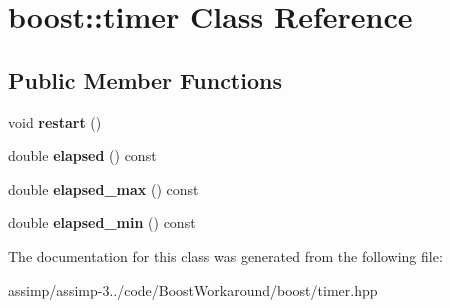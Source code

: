 \hypertarget{classboost_1_1timer}{\section{boost\+:\+:timer Class Reference}
\label{classboost_1_1timer}
}
\subsection*{Public Member Functions}
\begin{DoxyCompactItemize}
\item 
\hypertarget{classboost_1_1timer_a0f7ee8d5b08aed539e888e6e64a881f4}{void {\bfseries restart} ()}\label{classboost_1_1timer_a0f7ee8d5b08aed539e888e6e64a881f4}

\item 
\hypertarget{classboost_1_1timer_a46042fa25652d6fecee47415ea42c597}{double {\bfseries elapsed} () const }\label{classboost_1_1timer_a46042fa25652d6fecee47415ea42c597}

\item 
\hypertarget{classboost_1_1timer_adbb0458e18c7e609062cbbfd199d42da}{double {\bfseries elapsed\+\_\+max} () const }\label{classboost_1_1timer_adbb0458e18c7e609062cbbfd199d42da}

\item 
\hypertarget{classboost_1_1timer_af4f6a98f738f77699c2555ec99888d36}{double {\bfseries elapsed\+\_\+min} () const }\label{classboost_1_1timer_af4f6a98f738f77699c2555ec99888d36}

\end{DoxyCompactItemize}


The documentation for this class was generated from the following file\+:\begin{DoxyCompactItemize}
\item 
assimp/assimp-\/3../code/\+Boost\+Workaround/boost/timer.\+hpp\end{DoxyCompactItemize}
